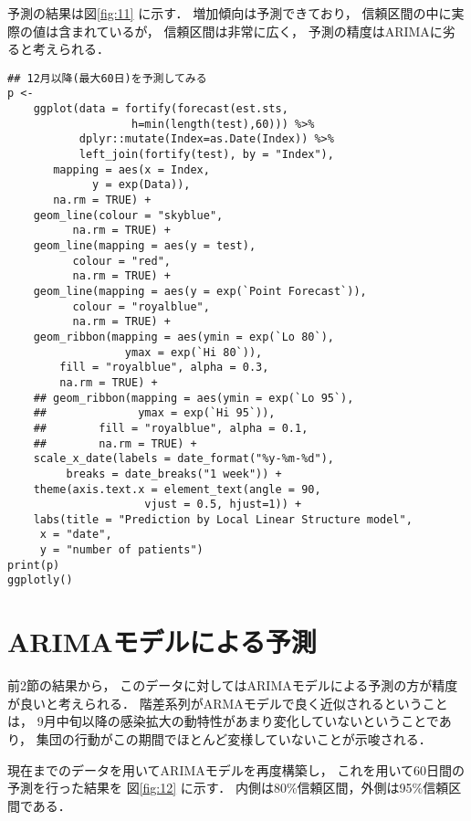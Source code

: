 \documentclass[10pt,oneside,fleqn]{scrartcl}
\begin{document}
予測の結果は図\ref{fig:11} に示す．
増加傾向は予測できており，
信頼区間の中に実際の値は含まれているが，
信頼区間は非常に広く，
予測の精度はARIMAに劣ると考えられる．

\begin{figure}[htbp]
  \centering
  \myGraph[1]{}
\end{figure}

\begin{verbatim}
## 12月以降(最大60日)を予測してみる
p <- 
    ggplot(data = fortify(forecast(est.sts,
				   h=min(length(test),60))) %>%
	       dplyr::mutate(Index=as.Date(Index)) %>%
	       left_join(fortify(test), by = "Index"), 
	   mapping = aes(x = Index,
			 y = exp(Data)),
	   na.rm = TRUE) +
    geom_line(colour = "skyblue",
	      na.rm = TRUE) +
    geom_line(mapping = aes(y = test),
	      colour = "red",
	      na.rm = TRUE) +
    geom_line(mapping = aes(y = exp(`Point Forecast`)),
	      colour = "royalblue",
	      na.rm = TRUE) +
    geom_ribbon(mapping = aes(ymin = exp(`Lo 80`),
			      ymax = exp(`Hi 80`)),
		fill = "royalblue", alpha = 0.3,
		na.rm = TRUE) +
    ## geom_ribbon(mapping = aes(ymin = exp(`Lo 95`),
    ##   			ymax = exp(`Hi 95`)),
    ##   	  fill = "royalblue", alpha = 0.1,
    ##   	  na.rm = TRUE) +
    scale_x_date(labels = date_format("%y-%m-%d"), 
		 breaks = date_breaks("1 week")) + 
    theme(axis.text.x = element_text(angle = 90,
				     vjust = 0.5, hjust=1)) +
    labs(title = "Prediction by Local Linear Structure model",
	 x = "date",
	 y = "number of patients")
print(p)
ggplotly()
\end{verbatim}

\section{ARIMAモデルによる予測}
\label{sec:org663447a}

前2節の結果から，
このデータに対してはARIMAモデルによる予測の方が精度が良いと考えられる．
階差系列がARMAモデルで良く近似されるということは，
9月中旬以降の感染拡大の動特性があまり変化していないということであり，
集団の行動がこの期間でほとんど変様していないことが示唆される．

現在までのデータを用いてARIMAモデルを再度構築し，
これを用いて60日間の予測を行った結果を
図\ref{fig:12} に示す．
内側は80\%信頼区間，外側は95\%信頼区間である．

\begin{figure}[htbp]
  \centering
  \myGraph[1]{}
\end{figure}
\end{document}
